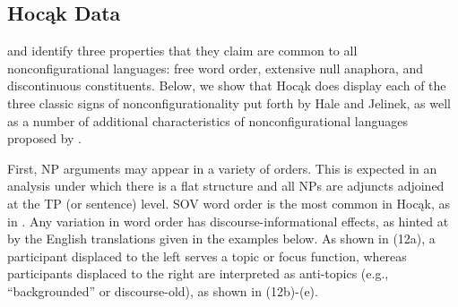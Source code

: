 \documentclass[output=paper]{LSP/langsci}
\begin{document}
\subsection{Hocąk Data}

\citet{Hale1983} and \citet{Jelinek1984} identify three properties that they claim are common to all nonconfigurational languages: free word order, extensive null anaphora, and discontinuous constituents. Below, we show that Hocąk does display each of the three classic signs of nonconfigurationality put forth by Hale and Jelinek, as well as a number of additional characteristics of nonconfigurational languages proposed by \citet{Baker1996}.  

First, NP arguments may appear in a variety of orders.  This is expected in an analysis under which there is a flat structure and all NPs are adjuncts adjoined at the TP (or sentence) level. SOV word order is the most common in Hocąk, as in . Any variation in word order has discourse-informational effects, as hinted at by the English translations given in the examples below. As shown in (12a), a participant displaced to the left serves a topic or focus function, whereas participants displaced to the right are interpreted as anti-topics (e.g., ``backgrounded'' or discourse-old), as shown in (12b)-(e).
\end{document}
